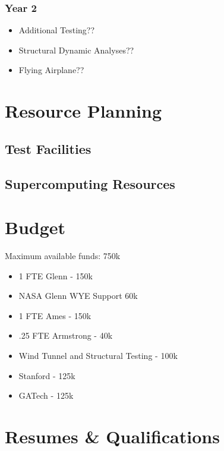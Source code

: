 \documentclass[]{aiaa-tc}
\begin{document}
        \subsubsection{Year 2}
            \begin{itemize}
                \item Additional Testing?? 
                \item Structural Dynamic Analyses?? 
                \item Flying Airplane??
            \end{itemize}

  \section{Resource Planning}
    \subsection{Test Facilities}
    \subsection{Supercomputing Resources}

  \appendix

  \section{Budget}
    Maximum available funds: 750k 
    \begin{itemize}
        \item 1 FTE Glenn - 150k 
        \item NASA Glenn WYE Support 60k 
        \item 1 FTE Ames - 150k 
        \item .25 FTE Armstrong - 40k
        \item Wind Tunnel and Structural Testing - 100k 
        \item Stanford - 125k 
        \item GATech - 125k
    \end{itemize}

  \section{Resumes \& Qualifications}


  
\end{document}

